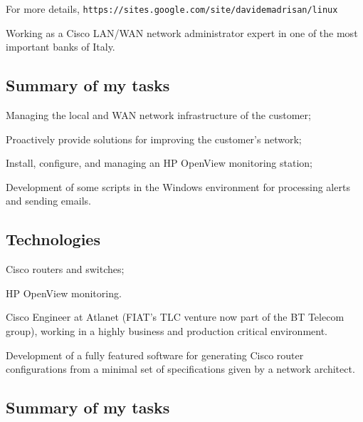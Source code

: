 For more details,
\hfill\break\noindent
{\tt https:/\negthinspace/sites.google.com/site/davidemadrisan/linux}



Working as a Cisco LAN/WAN network administrator expert in one of the most
important banks of Italy.

\subsection{Summary of my tasks}

\item{\bdot} Managing the local and WAN network infrastructure of the customer;
\item{\bdot} Proactively provide solutions for improving the customer's network;
\item{\bdot} Install, configure, and managing an HP OpenView monitoring station;
\item{\bdot} Development of some scripts in the Windows environment for 
   processing alerts and sending emails.

\subsection{Technologies}

\item{\bdot} Cisco routers and switches;
\item{\bdot} HP OpenView monitoring.
 


Cisco Engineer at Atlanet (FIAT's TLC venture now part of the BT Telecom group), 
working in a highly business and production critical environment.

Development of a fully featured software for generating Cisco router
configurations from a minimal set of specifications given by a network architect.

\subsection{Summary of my tasks}

